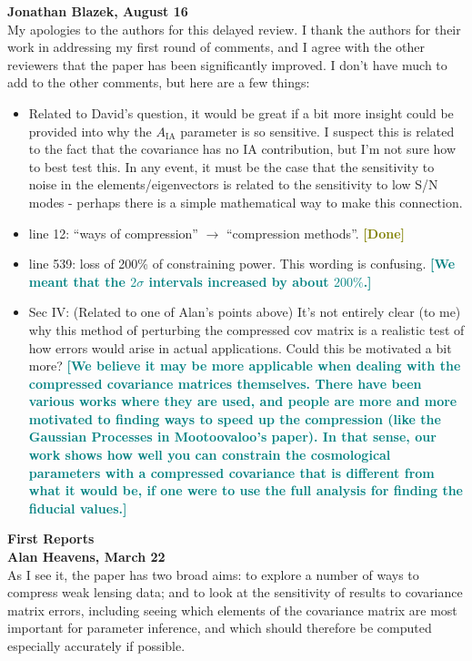 \documentclass{article}
\newcommand\reply[1]{{\bf {\textcolor{teal}{[#1]}}}}
\newcommand\done{{\bf {\textcolor{olive}{[Done]}}}}
\begin{document}
	
	\textbf{Jonathan Blazek, August 16} \\

    My apologies to the authors for this delayed review. I thank the authors for their work in addressing my first round of comments, and I agree with the other reviewers that the paper has been significantly improved. I don't have much to add to the other comments, but here are a few things: 
    \begin{itemize}
        \item Related to David's question, it would be great if a bit more insight could be provided into why the $A_{\mathrm{IA}}$ parameter is so sensitive. I suspect this is related to the fact that the covariance has no IA contribution, but I'm not sure how to best test this. In any event, it must be the case that the sensitivity to noise in the elements/eigenvectors is related to the sensitivity to low S/N modes - perhaps there is a simple mathematical way to make this connection.
        \item line 12: “ways of compression” $\rightarrow$ “compression methods”. \done
        \item line 539: loss of 200\% of constraining power. This wording is confusing. \reply{We meant that the $2 \sigma$ intervals increased by about $200\%$.}
        \item Sec IV: (Related to one of Alan's points above) It's not entirely clear (to me) why this method of perturbing the compressed cov matrix is a realistic test of how errors would arise in actual applications. Could this be motivated a bit more? \reply{We believe it may be more applicable when dealing with the compressed covariance matrices themselves. There have been various works where they are used, and people are more and more motivated to finding ways to speed up the compression (like the Gaussian Processes in Mootoovaloo's paper). In that sense, our work shows how well you can constrain the cosmological parameters with a compressed covariance that is different from what it would be, if one were to use the full analysis for finding the fiducial values.}
    \end{itemize}

    
    \pagebreak

    {\Large\textbf{First Reports}}\\
	
	\textbf{Alan Heavens, March 22} \\
	
	As I see it, the paper has two broad aims: to explore a number of ways to compress weak lensing data; and to look at the sensitivity of results to covariance matrix errors, including seeing which elements of the covariance matrix are most important for parameter inference, and which should therefore be computed especially accurately if possible.
	
\end{document}
